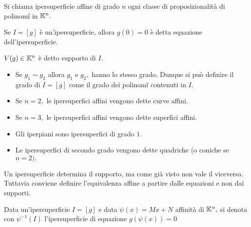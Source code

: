 \documentclass[a4paper,12pt]{article}
\newcommand{\Got}[1]{#1}
\newcommand{\got}[1]{{#1}}
\begin{document}
 \Got{Si chiama ipersuperficie affine di grado} $\got{n}$ \Got{ogni classe di proposizionalità di polinomî in} $\got{\K^n.}$
 
 \Got{Se} $\got{I=[g]}$ \Got{è un'ipersuperficie, allora} $\got{g(0)=0}$ \Got{è detta equazione dell'ipersuperficie.}
 
 $\got{V(g)\in \K^n}$ \Got{è detto supporto di} $\got{I.}$
 
 \begin{remark}
 \begin{itemize}
  \item \Got{Se} $\got{g_1\sim g_2}$ \Got{allora} $\got{g_1}$ \Got{e} $\got{g_2,}$ \Got{hanno lo stesso grado. Dunque si può definire il grado
  di} $\got{I=[g]}$ \Got{come il grado dei polinomî contenuti in} $\got{I.}$
  \item \Got{Se} $\got{n=2,}$ \Got{le ipersuperfici affini vengono dette curve affini.}
  \item \Got{Se} $\got{n=3,}$ \Got{le ipersuperfici affini vengono dette superfici affini.}
  \item \Got{Gli iperpiani sono ipersuperfici di grado} $\got{1.}$
  \item \Got{Le ipersuperfici di secondo grado vengono dette quadriche (o coniche se} $\got{n=2).}$
 \end{itemize}
 \end{remark}
 
 \begin{remark}
 \Got{Un ipersuperficie determina il supporto, ma come già visto non vale il viceversa. Tuttavia conviene definire
 l'equivalenza affine a partire dalle equazioni e non dai supporti.}
 \end{remark}
 
 \begin{definition}
 \Got{Data un'ipersuperficie} $\got{I=[g]}$ \Got{e data} $\got{\psi(x)=Mx+N}$ \Got{affinità di} $\got{\K^n,}$
 \Got{si denota con} $\got{\psi^{-1}(I)}$ \Got{l'ipersuperficie di equazione} $\got{g(\psi(x))=0}$
 \end{definition}
 
\end{document}

